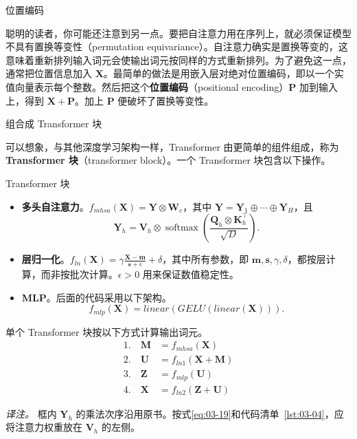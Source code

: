 \par\medskip\noindent 位置编码\par\nobreak\smallskip
聪明的读者，你可能还注意到另一点。要把自注意力用在序列上，就必须保证模型不具有置换等变性（permutation equivariance）。自注意力确实是置换等变的，这意味着重新排列输入词元会使输出词元按同样的方式重新排列。为了避免这一点，通常把位置信息加入 $\mathbf{X}$。最简单的做法是用嵌入层对绝对位置编码，即以一个实值向量表示每个整数。然后把这个\textbf{位置编码}（positional encoding）$\mathbf{P}$ 加到输入上，得到 $\mathbf{X}+\mathbf{P}$。加上 $\mathbf{P}$ 便破坏了置换等变性。

\par\medskip\noindent 组合成 Transformer 块\par\nobreak\smallskip
可以想象，与其他深度学习架构一样，Transformer 由更简单的组件组成，称为\textbf{Transformer 块}（transformer block）。一个 Transformer 块包含以下操作。

\begingroup
{}
\begin{booknote}{Transformer 块}
\begin{itemize}
\item \textbf{多头自注意力}。$f_{\mathit{mhsa}}(\mathbf{X})=\mathbf{Y}\otimes\mathbf{W}_c$，其中 $\mathbf{Y}=\mathbf{Y}_1\oplus\cdots\oplus\mathbf{Y}_H$，且
\[
\mathbf{Y}_h=\mathbf{V}_h\otimes\operatorname{softmax}\left(\frac{\mathbf{Q}_h\otimes\mathbf{K}_h^\top}{\sqrt{D}}\right).
\]
\item \textbf{层归一化}。$f_{\mathit{ln}}(\mathbf{X})=\gamma\frac{\mathbf{X}-\mathbf{m}}{\mathbf{s}+\epsilon}+\delta$，其中所有参数，即 $\mathbf{m},\mathbf{s},\gamma,\delta$，都按层计算，而非按批次计算。$\epsilon>0$ 用来保证数值稳定性。
\item \textbf{MLP}。后面的代码采用以下架构。
\[
f_{\mathit{mlp}}(\mathbf{X})=\mathit{linear}(\mathit{GELU}(\mathit{linear}(\mathbf{X}))).
\]
\end{itemize}
单个 Transformer 块按以下方式计算输出词元。
\begin{align}
1.\quad\mathbf{M}&=f_{\mathit{mhsa}}(\mathbf{X})
\tag{3.20}\label{eq:03-20}\\
2.\quad\mathbf{U}&=f_{\mathit{ln1}}(\mathbf{X}+\mathbf{M})
\tag{3.21}\label{eq:03-21}\\
3.\quad\mathbf{Z}&=f_{\mathit{mlp}}(\mathbf{U})
\tag{3.22}\label{eq:03-22}\\
4.\quad\mathbf{X}&=f_{\mathit{ln2}}(\mathbf{Z}+\mathbf{U})
\tag{3.23}\label{eq:03-23}
\end{align}
\end{booknote}
\endgroup
\emph{译注。} 框内 $\mathbf{Y}_h$ 的乘法次序沿用原书。按式\eqref{eq:03-19}和代码清单~\ref{lst:03-04}，应将注意力权重放在 $\mathbf{V}_h$ 的左侧。

